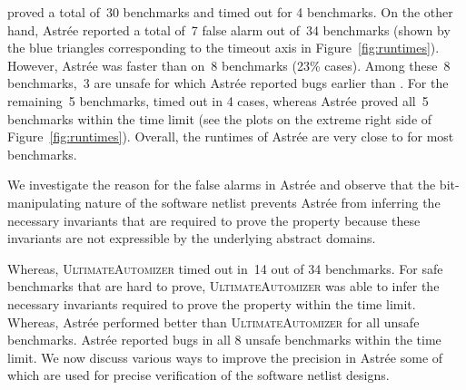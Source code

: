 %
\ABC proved a total of~30 benchmarks and timed out for 4 benchmarks.  
On the other hand, Astr{\'e}e reported a total of~7 false alarm out of~34 
benchmarks (shown by the blue triangles corresponding to the timeout axis in 
Figure~\ref{fig:runtimes}). However, Astr{\'e}e was faster than \ABC on~8 benchmarks (23\% cases).
%
Among these~8 benchmarks,~3 are unsafe for which Astr{\'e}e reported bugs
earlier than \ABC. For the remaining~5 benchmarks, \ABC timed out in 4 cases, 
whereas Astr{\'e}e proved all~5 benchmarks within the time limit (see the plots 
on the extreme right side of Figure~\ref{fig:runtimes}).  
%
Overall, the runtimes of Astr{\'e}e are very close to \ABC for most benchmarks. 
%

We investigate the reason for the false alarms in Astr{\'e}e and observe that 
the bit-manipulating nature of the software netlist prevents Astr{\'e}e from 
inferring the necessary invariants that are required to prove the property 
because these invariants are not expressible by the underlying abstract domains. 

Whereas, \textsc{UltimateAutomizer} timed out in~14 
out of 34 benchmarks. For safe benchmarks that are hard to prove, \textsc{UltimateAutomizer} 
was able to infer the necessary invariants required to prove the property within 
the time limit. 
Whereas, Astr{\'e}e performed better than \textsc{UltimateAutomizer} for all 
unsafe benchmarks.  Astr{\'e}e reported bugs in all 8 unsafe benchmarks within 
the time limit.  We now discuss various ways to improve the precision in
Astr{\'e}e some of which are used for precise verification of the software
netlist designs. 


